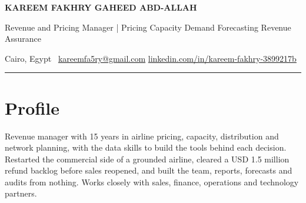 


{\LARGE\bfseries KAREEM FAKHRY GAHEED ABD-ALLAH}\par\vspace{3pt}
{\color{muted}Revenue and Pricing Manager | Pricing \textperiodcentered{} Capacity \textperiodcentered{} Demand Forecasting \textperiodcentered{} Revenue Assurance}\par\vspace{3pt}
{\small\color{muted}Cairo, Egypt \ifx\cvphone\empty\else\enspace\textperiodcentered\enspace \cvphone\ \fi\enspace\textperiodcentered\enspace \href{mailto:kareemfa5ry@gmail.com}{kareemfa5ry@gmail.com} \enspace\textperiodcentered\enspace \href{https://www.linkedin.com/in/kareem-fakhry-3899217b/}{linkedin.com/in/kareem-fakhry-3899217b}}\par\vspace{2pt}
{\color{rule}\rule{\linewidth}{0.6pt}}

\section{Profile}
Revenue manager with 15 years in airline pricing, capacity, distribution and network planning, with the data skills to build the tools behind each decision. Restarted the commercial side of a grounded airline, cleared a USD 1.5 million refund backlog before sales reopened, and built the team, reports, forecasts and audits from nothing. Works closely with sales, finance, operations and technology partners.\par

